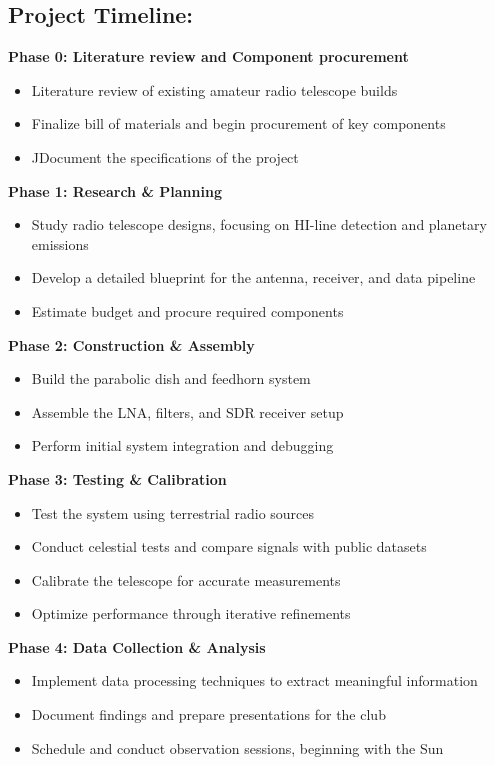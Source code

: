 \documentclass[12pt]{report}
\begin{document}
    \begin{flushleft}

\section*{Project Timeline:}
    \textbf{Phase 0: Literature review and Component procurement}
    \begin{itemize}[leftmargin=1.5em]
        \item Literature review of existing amateur radio telescope builds 
        \item Finalize bill of materials and begin procurement of key components
        \item JDocument the specifications of the project
    \end{itemize}
    \textbf{Phase 1: Research \& Planning}
    \begin{itemize}[leftmargin=1.5em]
        \item Study radio telescope designs, focusing on HI-line detection and planetary emissions
        \item Develop a detailed blueprint for the antenna, receiver, and data pipeline
        \item Estimate budget and procure required components
    \end{itemize}

    \textbf{Phase 2: Construction \& Assembly}
    \begin{itemize}[leftmargin=1.5em]
        \item Build the parabolic dish and feedhorn system
        \item Assemble the LNA, filters, and SDR receiver setup
        \item Perform initial system integration and debugging
    \end{itemize}

    \textbf{Phase 3: Testing \& Calibration}
    \begin{itemize}[leftmargin=1.5em]
        \item Test the system using terrestrial radio sources
        \item Conduct celestial tests and compare signals with public datasets
        \item Calibrate the telescope for accurate measurements
        \item Optimize performance through iterative refinements
    \end{itemize}

    \textbf{Phase 4: Data Collection \& Analysis}
    \begin{itemize}[leftmargin=1.5em]
        \item Implement data processing techniques to extract meaningful information
        \item Document findings and prepare presentations for the club
        \item Schedule and conduct observation sessions, beginning with the Sun
    \end{itemize}
    \end{flushleft}
\end{document}
